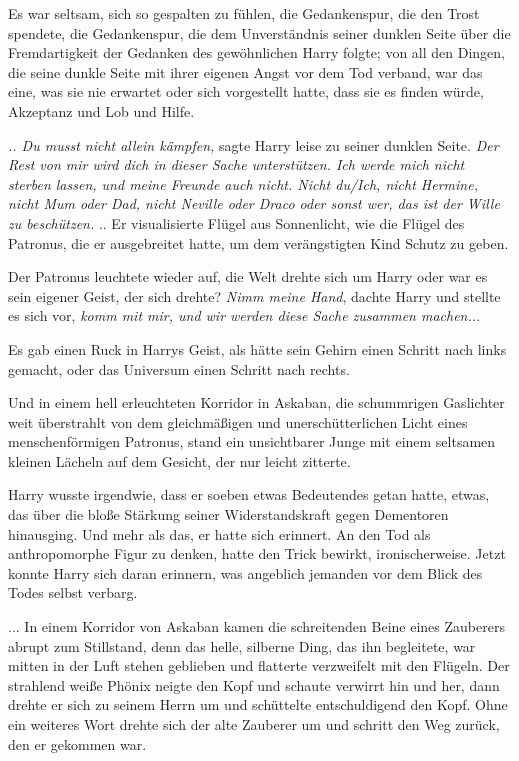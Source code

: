 Es war seltsam, sich so gespalten zu fühlen, die Gedankenspur, die den Trost
spendete, die Gedankenspur, die dem Unverständnis seiner dunklen Seite über die
Fremdartigkeit der Gedanken des gewöhnlichen Harry folgte; von all den Dingen,
die seine dunkle Seite mit ihrer eigenen Angst vor dem Tod verband, war das
eine, was sie nie erwartet oder sich vorgestellt hatte, dass sie es finden
würde, Akzeptanz und Lob und Hilfe.

\emph{.. Du musst nicht allein kämpfen,} sagte Harry leise zu seiner dunklen
Seite.\emph{ Der Rest von mir wird dich in dieser Sache unterstützen. Ich werde
mich nicht sterben lassen, und meine Freunde auch nicht. Nicht du/Ich, nicht
Hermine, nicht Mum oder Dad, nicht Neville oder Draco oder sonst wer, das ist
der Wille zu beschützen.} .. Er visualisierte Flügel aus Sonnenlicht, wie die
Flügel des Patronus, die er ausgebreitet hatte, um dem verängstigten Kind Schutz
zu geben.

Der Patronus leuchtete wieder auf, die Welt drehte sich um Harry oder war es
sein eigener Geist, der sich drehte? \emph{Nimm meine Hand}, dachte Harry und
stellte es sich vor, \emph{komm mit mir, und wir werden diese Sache zusammen
machen...}

Es gab einen Ruck in Harrys Geist, als hätte sein Gehirn einen Schritt nach
links gemacht, oder das Universum einen Schritt nach rechts.

Und in einem hell erleuchteten Korridor in Askaban, die schummrigen Gaslichter
weit überstrahlt von dem gleichmäßigen und unerschütterlichen Licht eines
menschenförmigen Patronus, stand ein unsichtbarer Junge mit einem seltsamen
kleinen Lächeln auf dem Gesicht, der nur leicht zitterte.

Harry wusste irgendwie, dass er soeben etwas Bedeutendes getan hatte, etwas, das
über die bloße Stärkung seiner Widerstandskraft gegen Dementoren hinausging. Und
mehr als das, er hatte sich erinnert. An den Tod als anthropomorphe Figur zu
denken, hatte den Trick bewirkt, ironischerweise. Jetzt konnte Harry sich daran
erinnern, was angeblich jemanden vor dem Blick des Todes selbst verbarg.

... In einem Korridor von Askaban kamen die schreitenden Beine eines Zauberers
abrupt zum Stillstand, denn das helle, silberne Ding, das ihn begleitete, war
mitten in der Luft stehen geblieben und flatterte verzweifelt mit den Flügeln.
Der strahlend weiße Phönix neigte den Kopf und schaute verwirrt hin und her,
dann drehte er sich zu seinem Herrn um und schüttelte entschuldigend den Kopf.
Ohne ein weiteres Wort drehte sich der alte Zauberer um und schritt den Weg
zurück, den er gekommen war.

